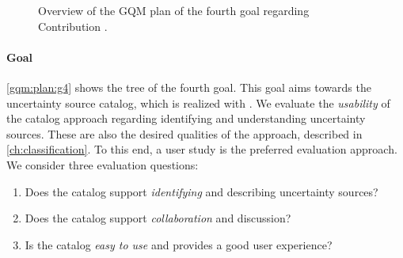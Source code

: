 \newcommand{\textGiv}[0]{Validate the catalog approach's \emph{usability} in identifying and understanding uncertainty sources in software architectures.}
\newcommand{\textGivQi}[0]{Does the catalog support \emph{identifying} and describing uncertainty sources?}
\newcommand{\textGivQii}[0]{Does the catalog support \emph{collaboration} and discussion?}
\newcommand{\textGivQiii}[0]{Is the catalog \emph{easy to use} and provides a good user experience?}
\newcommand{\textGivQiMi}[0]{Percentage of correct answers $\in [0,1]$}
\newcommand{\textGivQiiMi}[0]{Percentage of correct answers $\in [0,1]$}
\newcommand{\textGivQiiiMi}[0]{\acf{SUS} $\in [0,100]$}
\newcommand{\textGivQiiiMii}[0]{Average \emph{usefulness and intuitiveness} rating $\in [1,4]$}
\begin{figure}
    \centering
    \caption{Overview of the \ac*{GQM} plan of the fourth goal regarding Contribution .}
    \label{gqm:plan:g4}
\end{figure}

\paragraph{Goal }\label{gqm:text:g:4}
\autoref{gqm:plan:g4} shows the tree of the fourth goal.
This goal aims towards the uncertainty source catalog, which is realized with \arcen.
We evaluate the \emph{usability} of the catalog approach regarding identifying and understanding uncertainty sources.
These are also the desired qualities of the approach, described in \autoref{ch:classification}.
To this end, a user study is the preferred evaluation approach.
We consider three evaluation questions:

\begin{enumerate}[leftmargin=\GQMquestionsIndent]
  \item[\question{4}{1}] \textGivQi 
  \item[\question{4}{2}] \textGivQii
  \item[\question{4}{3}] \textGivQiii
\end{enumerate}

